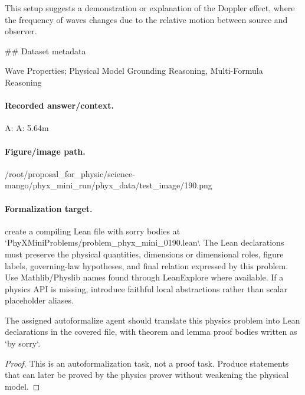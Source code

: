 This setup suggests a demonstration or explanation of the Doppler effect, where the frequency of waves changes due to the relative motion between source and observer.

\#\# Dataset metadata

Wave Properties; Physical Model Grounding Reasoning, Multi-Formula Reasoning

\paragraph{Recorded answer/context.}
A: A: 5.64m

\paragraph{Figure/image path.}
/root/proposal\_for\_physic/science-mango/phyx\_mini\_run/phyx\_data/test\_image/190.png

\paragraph{Formalization target.}
create a compiling Lean file with sorry bodies at `PhyXMiniProblems/problem\_phyx\_mini\_0190.lean`. The Lean declarations must preserve the physical quantities, dimensions or dimensional roles, figure labels, governing-law hypotheses, and final relation expressed by this problem.
Use Mathlib/Physlib names found through LeanExplore where available. If a physics API is missing, introduce faithful local abstractions rather than scalar placeholder aliases.

\begin{theorem}
\label{thm:physics:phyx_mini_0190:target}
The assigned autoformalize agent should translate this physics problem into Lean declarations in the covered file, with theorem and lemma proof bodies written as `by sorry`.
\end{theorem}
\begin{proof}
This is an autoformalization task, not a proof task. Produce statements that can later be proved by the physics prover without weakening the physical model.
\end{proof}

